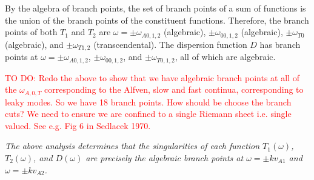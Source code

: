 \documentclass[12pt]{article}
\begin{document}
By the algebra of branch points, the set of branch points of a sum of functions is the union of the branch points of the constituent functions. Therefore, the branch points of both $T_1$ and $T_2$ are $\omega = \pm \omega_{A0,1,2}$ (algebraic), $\pm \omega_{00,1,2}$ (algebraic), $\pm \omega_{T0}$ (algebraic), and $\pm \omega_{T1,2}$ (transcendental). The dispersion function $D$ has branch points at $\omega = \pm \omega_{A0,1,2}$, $\pm \omega_{00,1,2}$, and $\pm \omega_{T0,1,2}$, all of which are algebraic.

\textcolor{red}{TO DO: Redo the above to show that we have algebraic branch points at all of the $\omega_{A,0,T}$ corresponding to the Alfven, slow and fast continua, corresponding to leaky modes. So we have 18 branch points. How should be choose the branch cuts? We need to ensure we are confined to a single Riemann sheet i.e. single valued. See e.g. Fig 6 in Sedlacek 1970.}

\textit{The above analysis determines that the singularities of each function $T_1(\omega)$, $T_2(\omega)$, and $D(\omega)$ are precisely the algebraic branch points at $\omega = \pm kv_{A1}$ and $\omega = \pm kv_{A2}$.}
\end{document}
